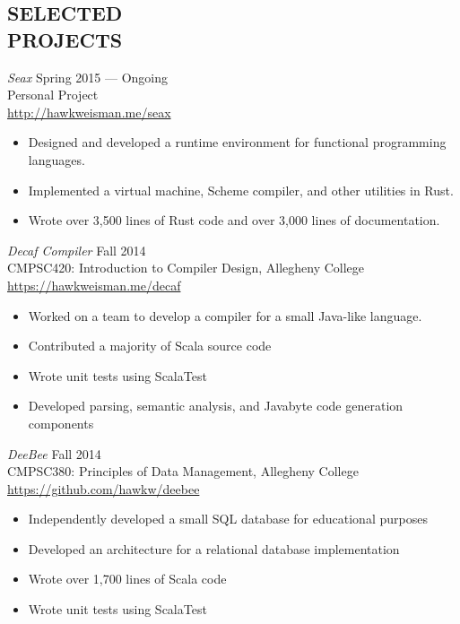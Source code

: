 \documentclass[margin]{res}
\begin{document}
\begin{resume}
\section{SELECTED \\ PROJECTS}

        {\sl Seax} \hfill Spring 2015 --- Ongoing \\
        Personal Project \\
        \url{http://hawkweisman.me/seax}
        \begin{itemize} \itemsep -2pt
            \item Designed and developed a runtime environment for functional programming languages.
            \item Implemented a virtual machine, Scheme compiler, and other utilities in Rust.
            \item Wrote over 3,500 lines of Rust code and over 3,000 lines of documentation.
        \end{itemize}

        {\sl Decaf Compiler} \hfill Fall 2014 \\
        CMPSC420: Introduction to Compiler Design, Allegheny College \\
        \url{https://hawkweisman.me/decaf}
        \begin{itemize} \itemsep -2pt %
        \item Worked on a team to develop a compiler for a small Java-like language.
        \item Contributed a majority of Scala source code
        \item Wrote unit tests using ScalaTest
        \item Developed parsing, semantic analysis, and Javabyte code generation components
        \end{itemize}

        {\sl DeeBee} \hfill Fall 2014 \\
        CMPSC380: Principles of Data Management, Allegheny College \\
        \url{https://github.com/hawkw/deebee}
        \begin{itemize} \itemsep -2pt %
        \item Independently developed a small SQL database for educational purposes
        \item Developed an architecture for a relational database implementation
        \item Wrote over 1,700 lines of Scala code
        \item Wrote unit tests using ScalaTest
        \end{itemize}


\end{resume}
\end{document}

